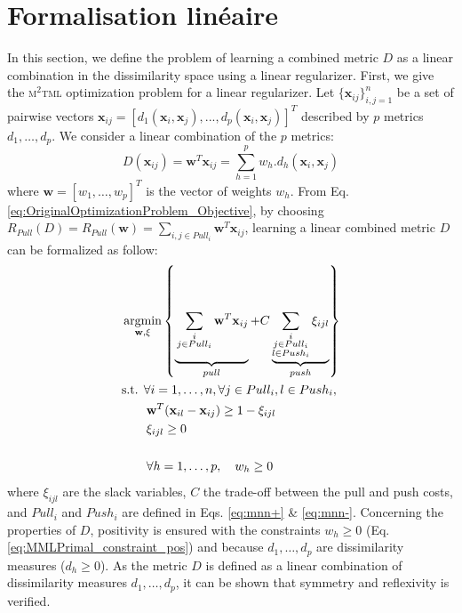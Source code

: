 \section*{Formalisation linéaire}
In this section, we define the problem of learning a combined metric $D$ as a linear combination in the dissimilarity space using a linear regularizer. First, we give the \textsc{m$^2$tml} optimization problem for a linear regularizer. 
\noindent Let $\{\textbf{x}_{ij}\}_{i,j=1}^n$ be a set of pairwise vectors $\textbf{x}_{ij}=[d_1(\textbf{x}_i,\textbf{x}_j), ..., d_p(\textbf{x}_i,\textbf{x}_j)]^T$  described by $p$ metrics $d_1, \ldots, d_p$. We consider a linear combination of the $p$ metrics:
\begin{equation}
D(\textbf{x}_{ij})=\textbf{w}^T\textbf{x}_{ij} = \sum_{h=1}^p w_h.d_h(\textbf{x}_i,\textbf{x}_j)
\label{eq:D_linear}
\end{equation}
where $\textbf{w}=[w_1, \ldots, w_p]^T$ is the vector of weights $w_h$. From Eq. \ref{eq:OriginalOptimizationProblem_Objective}, by choosing $R_{Pull}(D) = R_{Pull}(\textbf{w}) = \sum\limits_{i, j \in Pull_i} \textbf{w}^T\textbf{x}_{ij}$, learning a linear combined metric $D$ can be formalized as follow:
\begin{align}
	&\displaystyle 		\argmin_{\textbf{w},\xi}
	\left\lbrace \underbrace{
		\vphantom{ \sum\limits_{\substack{i \\ j \in Pull_i \\ l \in Push_i}} \xi_{ijl} }
		\sum\limits_{\substack{i \\ j \in Pull_i}} \textbf{w}^T\textbf{x}_{ij}
	}_{pull}					
	+	
	C \underbrace{				
		\sum\limits_{\substack{i \\ j \in Pull_i \\ l \in Push_i}}  \xi_{ijl}
	}_{push} \right\rbrace \nonumber \\
	&\text{s.t.  } \forall i = 1, \ldots, n, \forall j \in Pull_i, l \in Push_i, \label{eq:MMLPrimal} \\
	& \qquad \textbf{w}^T(\textbf{x}_{il}-\textbf{x}_{ij}) \geq 1-\xi_{ijl}  \nonumber \\
	& \qquad \xi_{ijl} \geq 0 \nonumber \\
	& \nonumber \\
	& \qquad \forall h=1, \ldots, p, \quad w_h \geq 0 \label{eq:MMLPrimal_constraint_pos}
\end{align}
\noindent where $\xi_{ijl}$ are the slack variables, $C$ the trade-off between the pull and push costs, and $Pull_i$ and $Push_i$ are defined in Eqs. \ref{eq:mnn+} \& \ref{eq:mnn-}. 
\noindent Concerning the properties of $D$, positivity is ensured with the constraints $w_h \geq 0$ (Eq. \ref{eq:MMLPrimal_constraint_pos}) and because $d_1, \ldots, d_p$ are dissimilarity measures ($d_h \geq 0$). As the metric $D$ is defined as a linear combination of dissimilarity measures $d_1, \ldots, d_p$, it can be shown that symmetry and reflexivity is verified.

